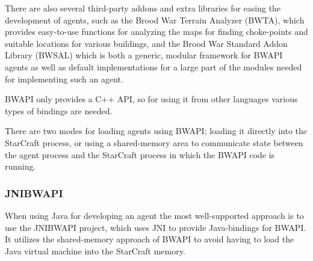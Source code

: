 There are also several third-party addons and extra libraries for easing the development of agents, such as the Brood War Terrain Analyzer (BWTA), which provides easy-to-use functions for analyzing the maps for finding choke-points and suitable locations for various buildings\cite{bwta}, and the Brood War Standard Addon Library (BWSAL) which is both a generic, modular framework for BWAPI agents as well as default implementations for a large part of the modules needed for implementing such an agent.\cite{bwsal}

BWAPI only provides a C++ API, so for using it from other languages various types of bindings are needed.\cite{jnibwapi}

There are two modes for loading agents using BWAPI; loading it directly into the StarCraft process, or using a shared-memory area to communicate state between the agent process and the StarCraft process in which the BWAPI code is running.\cite{bwapi}

\subsubsection{JNIBWAPI}
When using Java for developing an agent the most well-supported approach is to use the JNIBWAPI project, which uses JNI to provide Java-bindings for BWAPI. It utilizes the shared-memory approach of BWAPI to avoid having to load the Java virtual machine into the StarCraft memory.
